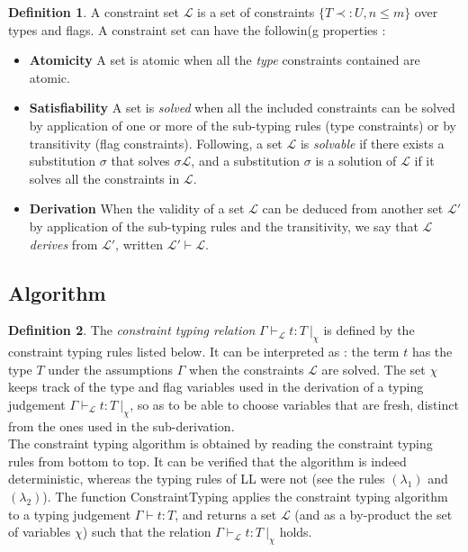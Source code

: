\documentclass[10pt]{article}
\theoremstyle{plain}
\theoremstyle{definition}
\newtheorem{defn}{Definition}[subsection] %
\begin{document}
\begin{defn} A constraint set $\mathcal{L}$ is a set of constraints $\{ T \prec: U, n \le m \}$ over types and flags.
  A constraint set can have the followin(g properties :
  \begin{itemize}
  	\item[]{\bf Atomicity} A set is atomic when all the \textit{type} constraints contained are atomic.
  	\item[]{\bf Satisfiability} A set is \textit{solved} when all the included constraints can be solved by application of one or
  		more of the sub-typing rules (type constraints) or by transitivity (flag constraints).
  		Following, a set $\mathcal{L}$ is \textit{solvable} if there exists a substitution $\sigma$ that solves $\sigma \mathcal{L}$, and
  		a substitution $\sigma$ is a solution of $\mathcal{L}$ if it solves all the constraints in $\mathcal{L}$.
	 	\item[]{\bf Derivation} When the validity of a set $\mathcal{L}$ can be deduced from another set $\mathcal{L'}$ by application of
		  the sub-typing rules and the transitivity, we say that $\mathcal{L}$ \textit{derives} from $\mathcal{L'}$,
		  written $\mathcal{L'} \vdash \mathcal{L}$.
  \end{itemize}
\end{defn}

\subsection{Algorithm}

\begin{defn} The \textit{constraint typing relation} $\Gamma \vdash_\mathcal{L} t : T ~|_\chi$ is defined by the constraint typing rules
	listed below. It can be interpreted as : the term $t$ has the type $T$ under the assumptions $\Gamma$ when the constraints $\mathcal{L}$
	are solved. The set $\chi$ keeps track of the type and flag variables used in the derivation of a typing judgement
	$\Gamma \vdash_\mathcal{L} t : T ~|_\chi$, so as to be able to choose variables that are fresh, distinct from the ones used in the sub-derivation. \\
  The constraint typing algorithm is obtained by reading the constraint typing rules from bottom to top. It can be verified that the algorithm
  is indeed deterministic, whereas the typing rules of LL were not (see the rules $(\lambda_1)$ and $(\lambda_2)$).
  The function ConstraintTyping applies the constraint typing algorithm to a typing judgement $\Gamma \vdash t : T$, and returns a set
  $\mathcal{L}$ (and as a by-product the set of variables $\chi$) such that the relation $\Gamma \vdash_\mathcal{L} t : T ~|_\chi$ holds.
\end{defn}
	
\end{document}
